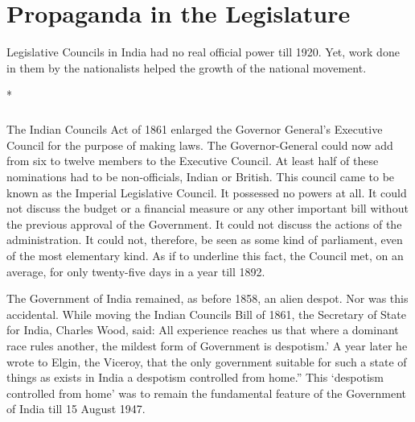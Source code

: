 \cleardoublepage
\chapter{Propaganda in the Legislature}

Legislative Councils in India had no real official power till 1920. Yet, work done in them by the nationalists helped the growth of the national movement.

\begin{center}*\end{center}

\paragraph*{}
The Indian Councils Act of 1861 enlarged the Governor­ General's Executive Council for the purpose of making laws. The Governor-General could now add from six to twelve members to the Executive Council. At least half of these nominations had to be non-officials, Indian or British. This council came to be known as the Imperial Legislative Council. It possessed no powers at all. It could not discuss the budget or a financial measure or any other important bill without the previous approval of the Government. It could not discuss the actions of the administration. It could not, therefore, be seen as some kind of parliament, even of the most elementary kind. As if to underline this fact, the Council met, on an average, for only twenty-five days in a year till 1892.

The Government of India remained, as before 1858, an alien despot. Nor was this accidental. While moving the Indian Councils Bill of 1861, the Secretary of State for India, Charles Wood, said: All experience reaches us that where a dominant race rules another, the mildest form of Government is despotism.' A year later he wrote to Elgin, the Viceroy, that the only government suitable for such a state of things as exists in India a despotism controlled from home.'' This `despotism controlled from home' was to remain the fundamental feature of the Government of India till 15 August 1947.

